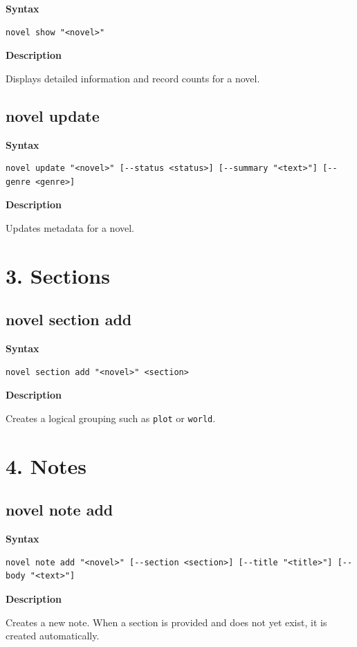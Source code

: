 \documentclass[11pt]{article}
\begin{document}
\textbf{Syntax}
\begin{verbatim}
novel show "<novel>"
\end{verbatim}

\textbf{Description}

Displays detailed information and record counts for a novel.

\subsection{novel update}

\textbf{Syntax}
\begin{verbatim}
novel update "<novel>" [--status <status>] [--summary "<text>"] [--genre <genre>]
\end{verbatim}

\textbf{Description}

Updates metadata for a novel.

\section{3. Sections}

\subsection{novel section add}

\textbf{Syntax}
\begin{verbatim}
novel section add "<novel>" <section>
\end{verbatim}

\textbf{Description}

Creates a logical grouping such as \texttt{plot} or \texttt{world}.

\section{4. Notes}

\subsection{novel note add}

\textbf{Syntax}
\begin{verbatim}
novel note add "<novel>" [--section <section>] [--title "<title>"] [--body "<text>"]
\end{verbatim}

\textbf{Description}

Creates a new note. When a section is provided and does not yet exist, it is created automatically.
\end{document}

